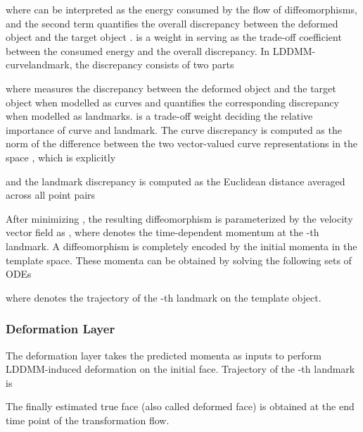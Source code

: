 \documentclass[10pt,twocolumn,letterpaper]{article}
\begin{document}
where  can be interpreted as the energy consumed by the flow of diffeomorphisms, and the second term quantifies the overall discrepancy between the deformed object  and the target object .  is a weight in  serving as the trade-off coefficient between the consumed energy and the overall discrepancy. In LDDMM-curvelandmark, the discrepancy consists of two parts
\begin{small}

\end{small}where  measures the discrepancy between the deformed object and the target object when modelled as curves and  quantifies the corresponding discrepancy when modelled as landmarks.  is a trade-off weight deciding the relative importance of curve and landmark. The curve discrepancy is computed as the norm of the difference between the two vector-valued curve representations in the space , which is explicitly 


and the landmark discrepancy is computed as the Euclidean distance averaged across all point pairs
\begin{small}

\end{small}

After minimizing , the resulting diffeomorphism  is parameterized by the velocity vector field  as , where  denotes the time-dependent momentum at the -th landmark. A diffeomorphism is completely encoded by the initial momenta in the template space. These momenta can be obtained by solving the following sets of ODEs


\begin{small}

\end{small}where  denotes the trajectory of the -th landmark on the template object.





\subsubsection{Deformation Layer}
The deformation layer takes the predicted momenta as inputs to perform LDDMM-induced deformation on the initial face. Trajectory of the -th landmark is

\begin{small}

\end{small}The finally estimated true face (also called deformed face) is obtained at the end time point of the transformation flow. 
\end{document}
